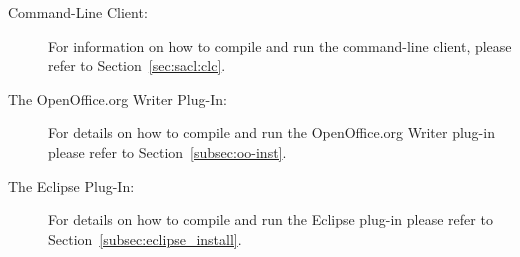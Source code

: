 \begin{description}
\item[Command-Line Client:] For information on how to compile and run
  the command-line client, please refer to Section~\ref{sec:sacl:clc}.

\item[The OpenOffice.org Writer Plug-In:] For details on how to
  compile and run the OpenOffice.org Writer plug-in please refer to
  Section~\ref{subsec:oo-inst}.

\item[The Eclipse Plug-In:] For details on how to
  compile and run the Eclipse plug-in please refer to
  Section~\ref{subsec:eclipse_install}.
\end{description}









